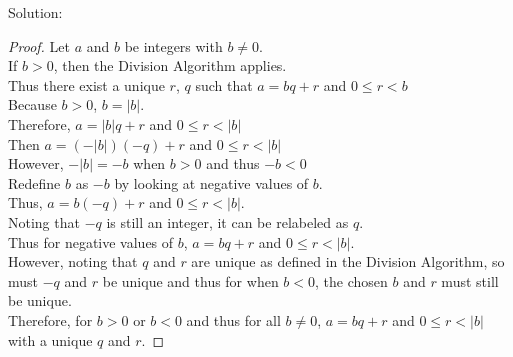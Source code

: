 \documentclass{article} %
\begin{document}
Solution: 
\begin{addmargin}[1em]{0em}
\begin{proof} \hfill \break
Let $a$ and $b$ be integers with $b \neq 0$.
\\If $b > 0$, then the Division Algorithm applies.
\\Thus there exist a unique $r$, $q$ such that $a = bq + r$ and $0 \leq r < b$
\\Because $b > 0$, $b = |b|$.
\\Therefore, $a = |b|q + r$ and $0 \leq r < |b|$
\\Then $a = (-|b|)(-q) + r$ and $0 \leq r < |b|$
\\However, $-|b| = -b$ when $b>0$ and thus $-b < 0$
\\Redefine $b$ as $-b$ by looking at negative values of $b$.
\\Thus, $a = b(-q) + r$ and $0 \leq r < |b|$.
\\Noting that $-q$ is still an integer, it can be relabeled as $q$.
\\Thus for negative values of $b$, $a = bq + r$ and $0 \leq r < |b|$.
\\However, noting that $q$ and $r$ are unique as defined in the Division Algorithm, so must $-q$ and $r$ be unique and thus for when $b < 0$, the chosen $b$ and $r$ must still be unique.
\\Therefore, for $b>0$ or $b<0$ and thus for all $b \neq 0$, $a = bq + r$ and $0 \leq r < |b|$ with a unique $q$ and $r$.
\end{proof}
\end{addmargin}

\end{document}
